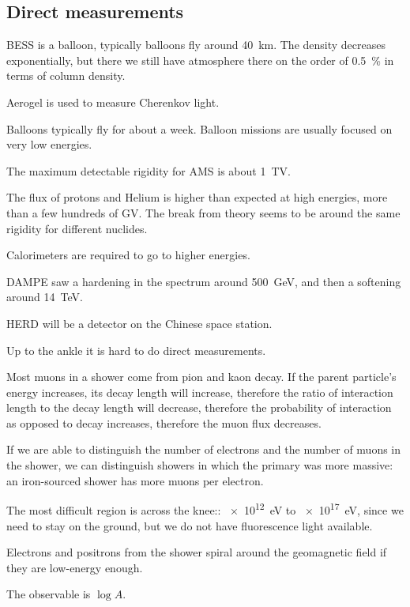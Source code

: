 \documentclass[main.tex]{subfiles}
\begin{document}
\subsection{Direct measurements}


BESS is a balloon, typically balloons fly around \SI{40}{km}. 
The density decreases exponentially, but there we still have atmosphere
there on the order of \SI{0.5}{\percent} in terms of column density. 

Aerogel is used to measure Cherenkov light. 

Balloons typically fly for about a week. 
Balloon missions are usually focused on very low energies.

The maximum detectable rigidity for AMS is about \SI{1}{TV}. 

The flux of protons and Helium is higher than expected at high energies, 
more than a few hundreds of GV. 
The break from theory seems to be around the same rigidity for different nuclides. 

Calorimeters are required to go to higher energies. 

DAMPE saw a hardening in the spectrum around \SI{500}{GeV}, and then a softening 
around \SI{14}{TeV}. 

HERD will be a detector on the Chinese space station.

Up to the ankle it is hard to do direct measurements. 

Most muons in a shower come from pion and kaon decay. 
If the parent particle's energy increases, its decay length will increase, 
therefore the ratio of interaction length to the decay length will decrease,
therefore the probability of interaction as opposed to decay increases, 
therefore the muon flux decreases. 

If we are able to distinguish the number of electrons and the number of muons 
in the shower, we can distinguish showers in which the primary was more massive:
an iron-sourced shower has more muons per electron. 

The most difficult region is across the knee:: \SI{e12}{eV} to \SI{e17}{eV},
since we need to stay on the ground, but we do not have fluorescence light available.

Electrons and positrons from the shower spiral around the geomagnetic field
if they are low-energy enough. 

The observable is \(\log A\). 
\end{document}
